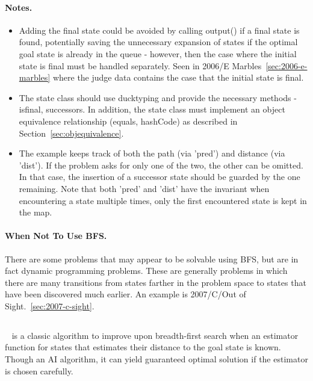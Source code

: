 \paragraph{Notes.}  
\begin{itemize}
\item Adding the final state could be avoided by calling output() if a 
final state is found, potentially saving the unnecessary expansion of states
if the optimal goal state is already in the queue - however, then the case where 
the initial state is final must be handled separately.  
Seen in 2006/E Marbles~\ref{sec:2006-e-marbles} where the judge data contains
the case that the initial state is final.

\item The state class should use ducktyping and provide the necessary
methods - isfinal, successors.  In addition, the state class must implement
an object equivalence relationship (equals, hashCode) as described in 
Section~\ref{sec:objequivalence}.

\item The example keeps track of both the path (via 'pred') and distance (via 'dist').
    If the problem asks for only one of the two, the other can be omitted. In that
    case, the insertion of a successor state should be guarded by the one remaining.
    Note that both 'pred' and 'dist' have the invariant when encountering a state 
    multiple times, only the first encountered state is kept in the map.

\end{itemize}

\paragraph{When Not To Use BFS.}

There are some problems that may appear to be solvable using BFS, but are in fact 
dynamic programming problems.  These are generally problems in which there are
many transitions from states farther in the problem space to states that have
been discovered much earlier.
An example is 2007/C/Out of Sight.~\ref{sec:2007-c-sight}.

\subsection{\astar}
\label{sec:astar}

\astar~\cite{Pearl:1984} is a classic algorithm to improve upon breadth-first search when an
estimator function for states that estimates their distance to the goal state is known.
Though an AI algorithm, it can yield guaranteed optimal solution if the estimator is chosen
carefully.

